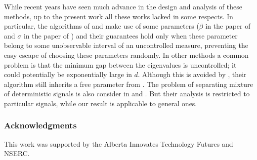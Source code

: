 \documentclass{article} %
\theoremstyle{definition}
\begin{document}
While recent years have seen much advance in the design and analysis of these methods, up to the present work all these works lacked in some respects.
In particular, the algorithms of \citet{arora2012provable} and \citet{goyal2014fourier} make use of some  parameters ($\beta$ in the paper of \citet{arora2012provable} and $\sigma$ in the paper of \citet{goyal2014fourier}) and their guarantees hold only when these parameter belong to some unobservable interval of an uncontrolled measure, preventing the easy escape of choosing these parameters randomly. In other methods
\citep{anandkumar2012tensordecomposition,anandkumar2012method,hsu2013learning} 
a common problem is that the minimum gap between the eigenvalues is uncontrolled; 
it could potentially be exponentially large in $d$.
Although this is avoided by \citet{vempala2014max}, their algorithm still inherits a free parameter from \citet{goyal2014fourier}.
The problem of separating mixture of deterministic signals is also consider in \citep{kirimoto2011separation} and \citep{forootan2013separation}. But their analysis is restricted to particular signals, while our result is applicable to general ones.


\subsubsection*{Acknowledgments}
This work was supported by the Alberta Innovates Technology Futures and NSERC.
\fi


\end{document}
